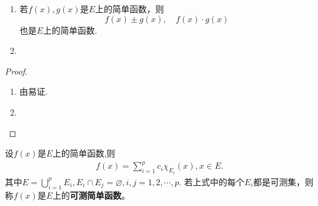 \documentclass[../../main.tex]{subfiles}
\begin{document}
\begin{proposition}\label{proposition:简单函数的性质}
\begin{enumerate}
\item 若$f(x),g(x)$是$E$上的简单函数，则$$f(x) \pm g(x),\quad f(x) \cdot g(x)$$
也是$E$上的简单函数.

\item 
\end{enumerate}
\end{proposition}
\begin{proof}
\begin{enumerate}
\item 由易证.

\item 
\end{enumerate}
\end{proof}

\begin{definition}[可测简单函数]
设$f(x)$是$E$上的简单函数,则
\begin{align*}
f(x)= \sum_{i = 1}^{p} c_i \chi_{E_i}(x),x \in E.
\end{align*}
其中$E = \bigcup_{i = 1}^{p} E_i,  E_i \cap E_j = \varnothing, i, j = 1, 2, \cdots, p.$
若上式中的每个$E_i$都是可测集，则称$f(x)$是$E$上的\textbf{可测简单函数}。
\end{definition}
\end{document}
